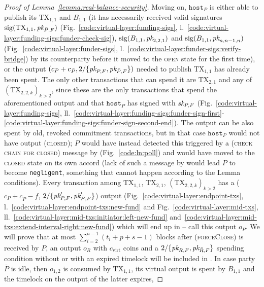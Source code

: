 \begin{proof}[Proof of Lemma~\ref{lemma:real-balance-security}]
  Moving on, $\texttt{host}_P$ is either able to publish its $\mathrm{TX}_{1,
  1}$ and $B_{1, 1}$ (it has necessarily received valid signatures
  $\mathrm{sig}(\mathrm{TX}_{1, 1}, \textit{pk}_{\bar{P}, F})$
  (Fig.~\ref{code:virtual-layer:funding-sigs},
  l.~\ref{code:virtual-layer:funding-sigs:funder-check-sig}),
  $\mathrm{sig}(B_{1, 1}, \textit{pk}_{2, 2, 1})$ and
  $\mathrm{sig}(B_{1, 1}, \textit{pk}_{n, n-1, n})$
  (Fig.~\ref{code:virtual-layer:funder-sigs},
  l.~\ref{code:virtual-layer:funder-sigs:verify-bridge}) by its counterparty
  before it moved to the \textsc{open} state for the first time), or the output
  $(c_P + c_{\bar{P}}, 2/\{\textit{pk}_{P, F}, \textit{pk}_{\bar{P}, F}\})$ needed to publish
  $\mathrm{TX}_{1, 1}$ has already been spent. The only other transactions that
  can spend it are $\mathrm{TX}_{2, 1}$ and any of $(\mathrm{TX}_{2, 2, k})_{k >
  2}$, since these are the only transactions that spend the aforementioned
  output and that $\texttt{host}_P$ has signed with $\textit{sk}_{P, F}$
  (Fig.~\ref{code:virtual-layer:funding-sigs},
  ll.~\ref{code:virtual-layer:funding-sigs:funder-sign-first}-\ref{code:virtual-layer:funding-sigs:funder-sign-second-end}).
  The output can be also spent by old, revoked commitment transactions, but in
  that case $\texttt{host}_P$ would not have output (\textsc{closed}); $P$ would
  have instead detected this triggered by a (\textsc{check chain for closed})
  message by \environment (Fig.~\ref{code:ln:poll}) and would have moved to the
  \textsc{closed} state on its own accord (lack of such a message by
  \environment would lead $P$ to become \texttt{negligent}, something that
  cannot happen according to the Lemma conditions). Every transaction among
  $\mathrm{TX}_{1, 1}$, $\mathrm{TX}_{2, 1}$, $(\mathrm{TX}_{2, 2, k})_{k > 2}$
  has a ($c_P + c_{\bar{P}} - f$, $2/\{\textit{pk}_{P, F}', \textit{pk}_{\bar{P}, F}'\}$) output
  (Fig.~\ref{code:virtual-layer:endpoint-txs},
  l.~\ref{code:virtual-layer:endpoint-txs:new-fund} and
  Fig.~\ref{code:virtual-layer:mid-txs},
  ll.~\ref{code:virtual-layer:mid-txs:initiator:left-new-fund}
  and~\ref{code:virtual-layer:mid-txs:extend-interval-right:new-fund}) which
  will end up in \ledger{} -- call this output $o_P$. We will prove that at most
  $\sum\limits_{i=2}^{n-1}(t_i + p + s - 1)$ blocks after (\textsc{forceClose}) is
  received by $P$, an output $o_R$ with $c_{\mathrm{virt}}$ coins and a
  $2/\{\textit{pk}_{R, F}, \textit{pk}_{\bar{R}, F}\}$ spending condition without or with an
  expired timelock will be included in \ledger. In case party $\bar{P}$ is idle,
  then $o_{1, 2}$ is consumed by $\mathrm{TX}_{1, 1}$, its virtual output is
  spent by $B_{1, 1}$ and the timelock on the output of the latter expires,

\end{proof}
